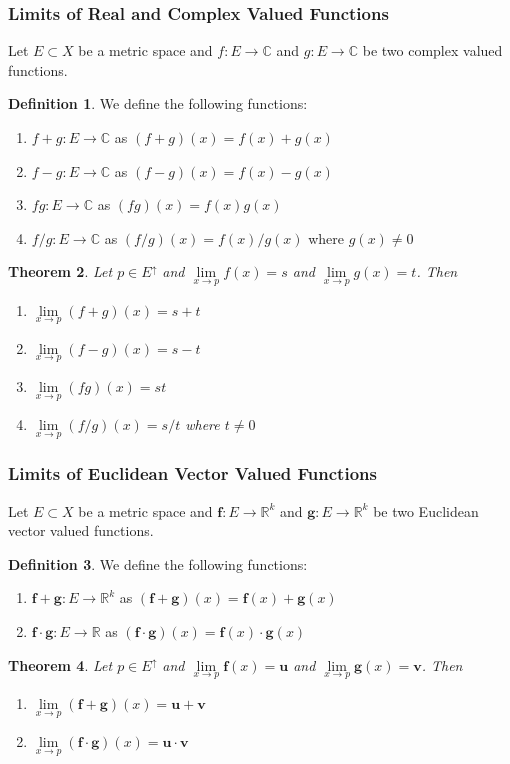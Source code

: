 \documentclass[a4paper,12pt]{report}
\newcommand{\R}{\mathbb{R}}
\newcommand{\C}{\mathbb{C}}
\newcommand{\bm}{\boldsymbol}
\theoremstyle{plain}
\newtheorem{theorem}{\color{blue}Theorem}[chapter] %
\theoremstyle{definition}
\newtheorem{definition}[theorem]{\color{red}Definition} %
\theoremstyle{remark}
\begin{document}
\subsubsection{Limits of Real and Complex Valued Functions}
Let $E\subset X$ be a metric space and $f:E\to\C$ and $g:E\to\C$ be two complex valued functions.
\begin{definition}
We define the following functions:
\begin{enumerate}
\item $f+g:E\to\C$ as $(f+g)(x)=f(x)+g(x)$
\item $f-g:E\to\C$ as $(f-g)(x)=f(x)-g(x)$
\item $fg:E\to\C$ as $(fg)(x)=f(x)g(x)$
\item $f/g:E\to\C$ as $(f/g)(x)=f(x)/g(x)$ where $g(x)\neq 0$
\end{enumerate}
\end{definition}
\begin{theorem}
Let $p\in E^{\uparrow}$ and $\lim\limits_{x\to p}f(x)=s$ and $\lim\limits_{x\to p}g(x)=t$. Then
\begin{enumerate}
\item $\lim\limits_{x\to p}(f+g)(x)=s+t$
\item $\lim\limits_{x\to p}(f-g)(x)=s-t$
\item $\lim\limits_{x\to p}(fg)(x)=st$
\item $\lim\limits_{x\to p}(f/g)(x)=s/t$ where $t\neq 0$
\end{enumerate}
\end{theorem}
\subsubsection{Limits of Euclidean Vector Valued Functions}
Let $E\subset X$ be a metric space and $\bm{f}:E\to\R^k$ and $\bm{g}:E\to\R^k$ be two Euclidean vector valued functions.
\begin{definition}
We define the following functions:
\begin{enumerate}
\item $\bm{f}+\bm{g}:E\to\R^k$ as $(\bm{f}+\bm{g})(x)=\bm{f}(x)+\bm{g}(x)$
\item $\bm{f}\cdot\bm{g}:E\to\R$ as $(\bm{f}\cdot\bm{g})(x)=\bm{f}(x)\cdot\bm{g}(x)$
\end{enumerate}
\end{definition}
\begin{theorem}
Let $p\in E^{\uparrow}$ and $\lim\limits_{x\to p}\bm{f}(x)=\bm{u}$ and $\lim\limits_{x\to p}\bm{g}(x)=\bm{v}$. Then
\begin{enumerate}
\item $\lim\limits_{x\to p}(\bm{f}+\bm{g})(x)=\bm{u}+\bm{v}$
\item $\lim\limits_{x\to p}(\bm{f}\cdot\bm{g})(x)=\bm{u}\cdot\bm{v}$
\end{enumerate}
\end{theorem}
\end{document}
